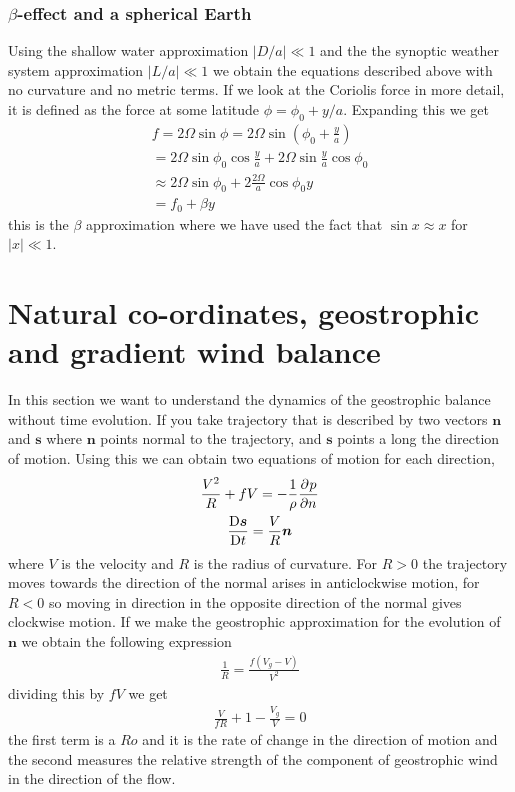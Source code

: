 \subsubsection{$\beta$-effect and a spherical Earth}
Using the shallow water approximation $|D/a|\ll1$ and the the synoptic weather system approximation $|L/a|\ll 1$ we obtain the equations described above with no curvature and no metric terms. If we look at the Coriolis force in more detail, it is defined as the force at some latitude $\phi = \phi_0 + y/a$. Expanding this we get 
\begin{gather*}
    f= 2\Omega\sin\phi = 2\Omega\sin(\phi_0+\frac{y}{a}) \\
    =2\Omega\sin\phi_0\cos\frac{y}{a}+2\Omega\sin\frac{y}{a}\cos\phi_0 \\  
    \approx 2\Omega\sin\phi_0+2\frac{2\Omega}{a}\cos\phi_0 y \\
    = f_0 + \beta y
\end{gather*}
this is the $\beta$ approximation where we have used the fact that $\sin x\approx x$ for $|x|\ll1$.
\section{Natural co-ordinates, geostrophic and gradient wind balance}
In this section we want to understand the dynamics of the geostrophic balance without time evolution. If you take trajectory that is described by two vectors $\bm{n}$ and $\bm{s}$ where $\bm{n}$ points normal to the trajectory, and $\bm{s}$ points a long the direction of motion. Using this we can obtain two equations of motion for each direction,
\begin{gather*}
\frac{V^2}{R}+fV=-\frac{1}{\rho}\displaystyle \frac{\partial^{} p}{\partial n^{}} \\
\displaystyle \frac{{\rm D} \bm{s}}{{\rm D} t}=\frac{V}{R}\bm{n}
\end{gather*}
where $V$ is the velocity and $R$ is the radius of curvature. For $R>0$ the trajectory moves towards the direction of the normal arises in anticlockwise motion, for $R<0$ so moving in direction in the opposite direction of the normal gives clockwise motion. If we make the geostrophic approximation for the evolution of $\bm{n}$ we obtain the following expression 
\begin{gather*}
    \frac{1}{R}=\frac{f(V_g-V)}{V^2}
\end{gather*}
dividing this by $fV$ we get 
\begin{gather*}
    \frac{V}{fR}+1-\frac{V_g}{V}=0
\end{gather*}
the first term is a $Ro$ and it is the rate of change in the direction of motion and the second measures the relative strength of the component of geostrophic wind in the direction of the flow. 

